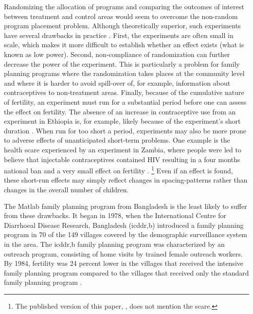 \documentclass[letterpaper,12pt]{article}
\begin{document}
Randomizing the allocation of programs and comparing the outcomes of
interest between treatment and control areas would seem to overcome the
non-random program placement problem. 
Although theoretically superior, such experiments have several drawbacks
in practice \citep{Portner2011}. 
First, the experiments are often small in scale, which makes it more
difficult to establish whether an effect exists (what is known as low
power). Second, non-compliance of randomization can further decrease the
power of the experiment. 
This is particularly a problem for family planning programs where the
randomization takes places at the community level and where it is harder
to avoid spill-over of, for example, information about contraceptives to
non-treatment areas. 
Finally, because of the cumulative nature of fertility, an experiment
must run for a substantial period before one can assess the effect on
fertility. 
The absence of an increase in contraceptive use from an experiment in
Ethiopia is, for example, likely because of the experiment's short
duration \citep{Desai2011}. 
When run for too short a period, experiments may also be more prone to
adverse effects of unanticipated short-term problems. 
One example is the health scare experienced by an experiment in Zambia,
where people were led to believe that injectable contraceptives
contained HIV resulting in a four months national ban and a very small
effect on fertility \citep{Ashraf2009}.%
\footnote{
The published version of this paper, \citet{Ashraf2014}, does not
mention the scare.} 
Even if an effect is found, these short-run effects may simply reflect
changes in spacing-patterns rather than changes in the overall number of
children.

The Matlab family planning program from Bangladesh is the least likely
to suffer from these drawbacks. 
It began in 1978, when the International Centre for Diarrhoeal Disease
Research, Bangladesh (icddr,b) introduced a family planning program in
70 of the 149 villages covered by the demographic surveillance system in
the area. 
The icddr,b family planning program was characterized by an outreach
program, consisting of home visits by trained female outreach workers. 
By 1984, fertility was 24 percent lower in the villages that received
the intensive family planning program compared to the villages that
received only the standard family planning program \citep{Phillips1988}.
\end{document}
